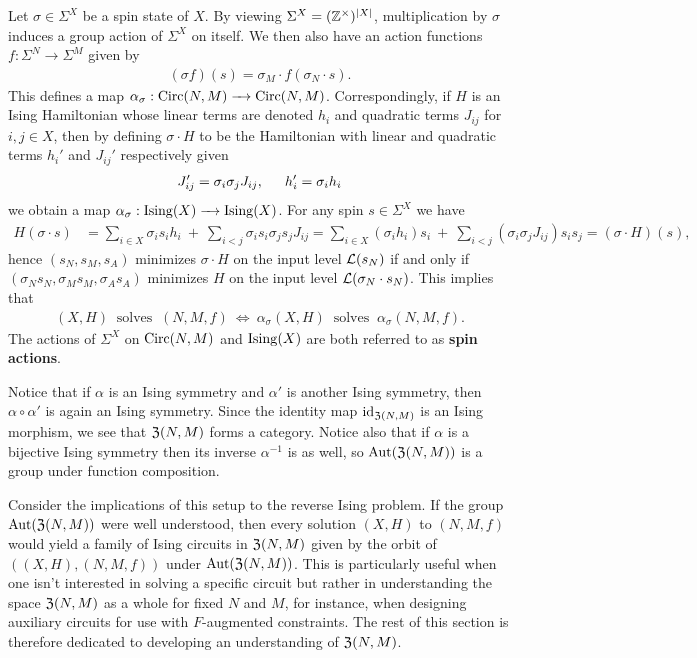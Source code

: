 \documentclass{article}
\begin{document}
\begin{example}\label{ex:spinaction}
  Let $\sigma \in \Sigma^X$ be a spin state of $X$. By viewing $\Sigma^X = (\mathbb{Z}^\times)^{|X|}$, multiplication by $\sigma$ induces a group action of $\Sigma^X$ on itself. We then also have an action functions $f:\Sigma^N \to \Sigma^M$ given by
  \begin{align*}
    (\sigma f)(s) = \sigma_M \cdot f(\sigma_N \cdot s).
  \end{align*}
  This defines a map $\alpha_\sigma: \Circ(N,M) \to \Circ(N,M)$. Correspondingly, if $H$ is an Ising Hamiltonian whose linear terms are denoted $h_i$ and quadratic terms $J_{ij}$ for $i,j \in X$, then by defining $\sigma \cdot H$ to be the Hamiltonian with linear and quadratic terms $h_i'$ and $J_{ij}'$ respectively given
  \begin{align*}
    J_{ij}' = \sigma_i\sigma_j J_{ij}, \hspace{1.5em} h_i' = \sigma_i h_i
  \end{align*}
  we obtain a map $\alpha_\sigma: \Ising(X) \to \Ising(X)$. For any spin $s\in \Sigma^X$ we have
  \begin{align*}
    H(\sigma \cdot s) 
      &= \sum_{i\in X} \sigma_i s_i h_i ~+~ \sum_{i < j} \sigma_{i} s_i \sigma_j s_j J_{ij}  = \sum_{i\in X} (\sigma_i h_i) s_i ~+~ \sum_{i<j} (\sigma_i\sigma_j J_{ij}) s_is_j = (\sigma \cdot H)(s),
  \end{align*}
  hence $(s_N, s_M, s_A)$ minimizes $\sigma \cdot H$ on the input level $\mathcal{L}(s_N)$ if and only if $(\sigma_N s_N, \sigma_M s_M, \sigma_A s_A)$ minimizes $H$ on the input level $\mathcal{L}(\sigma_N\cdot s_N)$. This implies that
  \begin{align*}
    (X,H) ~ \text{ solves } ~ (N,M,f) ~\Leftrightarrow ~ \alpha_\sigma (X,H) ~ \text{ solves } ~ \alpha_\sigma (N,M,f).
  \end{align*}
  The actions of $\Sigma^X$ on $\operatorname{Circ}(N,M)$ and $\operatorname{Ising}(X)$ are both referred to as \textbf{spin actions}.
\end{example}

Notice that if $\alpha$ is an Ising symmetry and $\alpha'$ is another Ising symmetry, then $\alpha\circ \alpha'$ is again an Ising symmetry. Since the identity map $\operatorname{id}_{\operatorname{\mathfrak{Z}}(N,M)}$ is an Ising morphism, we see that $\operatorname{\mathfrak{Z}}(N,M)$ forms a category. Notice also that if $\alpha$ is a bijective Ising symmetry then its inverse $\alpha^{-1}$ is as well, so $\operatorname{Aut}(\operatorname{\mathfrak{Z}}(N,M))$ is a group under function composition.

Consider the implications of this setup to the reverse Ising problem. If the group $\operatorname{Aut}(\operatorname{\mathfrak{Z}}(N,M))$ were well understood, then every solution $(X,H)$ to $(N,M,f)$ would yield a family of Ising circuits in $\operatorname{\mathfrak{Z}}(N,M)$ given by the orbit of $((X,H), (N,M,f))$ under $\operatorname{Aut}(\operatorname{\mathfrak{Z}}(N,M))$. This is particularly useful when one isn't interested in solving a specific circuit but rather in understanding the space $\operatorname{\mathfrak{Z}}(N,M)$ as a whole for fixed $N$ and $M$, for instance, when designing auxiliary circuits for use with $F$-augmented constraints. The rest of this section is therefore dedicated to developing an understanding of $\operatorname{\mathfrak{Z}}(N,M)$.
\end{document}

